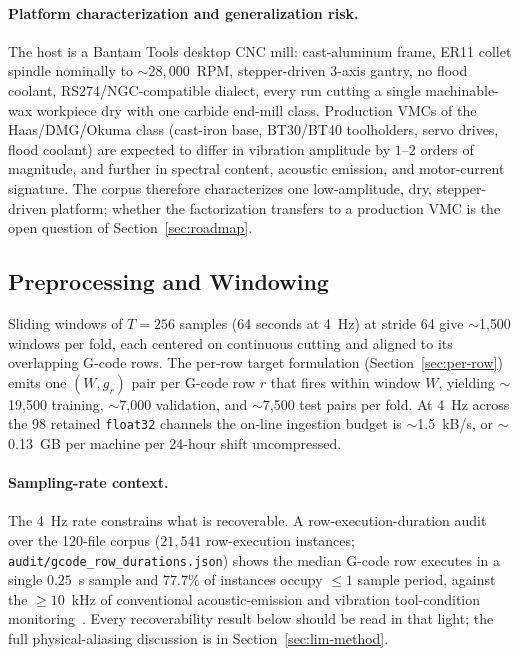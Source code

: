 \documentclass[sensors,article,submit,moreauthors,pdftex]{Definitions/mdpi}
\begin{document}
\paragraph{Platform characterization and generalization risk.} The host is a Bantam Tools desktop CNC mill: cast-aluminum frame, ER11 collet spindle nominally to $\sim 28{,}000$~RPM, stepper-driven 3-axis gantry, no flood coolant, RS274/NGC-compatible dialect, every run cutting a single machinable-wax workpiece dry with one carbide end-mill class. Production VMCs of the Haas/DMG/Okuma class (cast-iron base, BT30/BT40 toolholders, servo drives, flood coolant) are expected to differ in vibration amplitude by $1$--$2$ orders of magnitude, and further in spectral content, acoustic emission, and motor-current signature. The corpus therefore characterizes one low-amplitude, dry, stepper-driven platform; whether the factorization transfers to a production VMC is the open question of Section~\ref{sec:roadmap}.

\subsection{Preprocessing and Windowing}
\label{sec:preprocessing}

Sliding windows of $T=256$ samples (64 seconds at 4~Hz) at stride 64 give $\sim$1{,}500 windows per fold, each centered on continuous cutting and aligned to its overlapping G-code rows. The per-row target formulation (Section~\ref{sec:per-row}) emits one $(W, g_r)$ pair per G-code row $r$ that fires within window $W$, yielding $\sim$19{,}500 training, $\sim$7{,}000 validation, and $\sim$7{,}500 test pairs per fold. At 4~Hz across the 98 retained \texttt{float32} channels the on-line ingestion budget is $\sim$1.5~kB/s, or $\sim$0.13~GB per machine per 24-hour shift uncompressed.

\paragraph{Sampling-rate context.} The 4~Hz rate constrains what is recoverable. A row-execution-duration audit over the 120-file corpus ($21{,}541$ row-execution instances; \texttt{audit/gcode\_row\_durations.json}) shows the median G-code row executes in a single $0.25$~s sample and $77.7\%$ of instances occupy $\le\!1$ sample period, against the $\geq\!10$~kHz of conventional acoustic-emission and vibration tool-condition monitoring~\cite{teti2010advanced}. Every recoverability result below should be read in that light; the full physical-aliasing discussion is in Section~\ref{sec:lim-method}.
\end{document}
